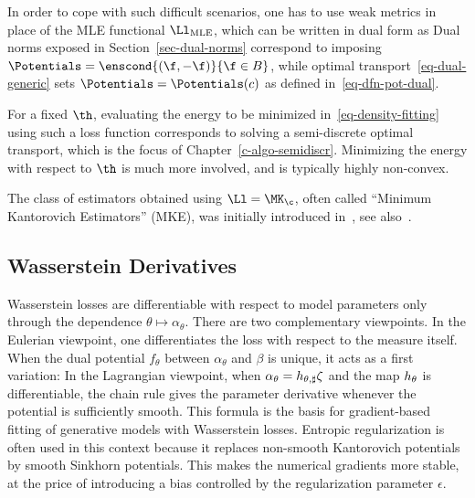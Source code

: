 In order to cope with such difficult scenarios, one has to use weak metrics in place of the MLE functional $\Ll_{\text{MLE}}$, which can be written in dual form as
Dual norms exposed in Section~\ref{sec-dual-norms} correspond to imposing $\Potentials = \enscond{(\f,-\f)}{\f \in B}$, while optimal transport~\eqref{eq-dual-generic} sets $\Potentials = \Potentials(c)$ as defined in~\eqref{eq-dfn-pot-dual}.

For a fixed $\th$, evaluating the energy to be minimized in~\eqref{eq-density-fitting} using such a loss function corresponds to solving a semi-discrete optimal transport, which is the focus of Chapter~\ref{c-algo-semidiscr}. Minimizing the energy with respect to $\th$ is much more involved, and is typically highly non-convex.

The class of estimators obtained using $\Ll=\MK_\c$, often called ``Minimum Kantorovich Estimators'' (MKE), was initially introduced in~\cite{bassetti2006minimum}, see also~\cite{CanasRosasco}.


\subsection{Wasserstein Derivatives}

Wasserstein losses are differentiable with respect to model parameters only through the dependence $\theta \mapsto \alpha_\theta$. There are two complementary viewpoints.
%
In the Eulerian viewpoint, one differentiates the loss with respect to the measure itself. When the dual potential $f_\theta$ between $\alpha_\theta$ and $\beta$ is unique, it acts as a first variation:
%
In the Lagrangian viewpoint, when $\alpha_\theta=h_{\theta,\sharp}\zeta$ and the map $h_\theta$ is differentiable, the chain rule gives the parameter derivative
whenever the potential is sufficiently smooth. This formula is the basis for gradient-based fitting of generative models with Wasserstein losses.
%
Entropic regularization is often used in this context because it replaces non-smooth Kantorovich potentials by smooth Sinkhorn potentials. This makes the numerical gradients more stable, at the price of introducing a bias controlled by the regularization parameter $\epsilon$.


